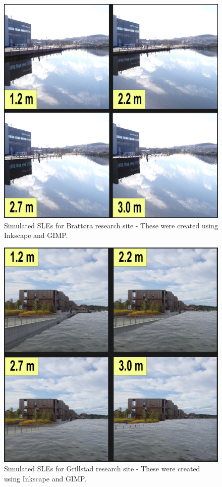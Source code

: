 \begin{figure}[H]
    \centering
    \includegraphics[width=16cm]{fig_sle/brattora 2090 q.png}
    \caption{Simulated SLEs for Brattøra research site - These were created using Inkscape and GIMP. }
    \label{fig:SLE-brattora}
\end{figure}

\begin{figure}[H]
    \centering
    \includegraphics[width=16cm]{fig_sle/grillstad 2090 q.png}
    \caption{Simulated SLEs for Grillstad research site - These were created using Inkscape and GIMP. }
    \label{fig:SLE-grillstad}
\end{figure}


